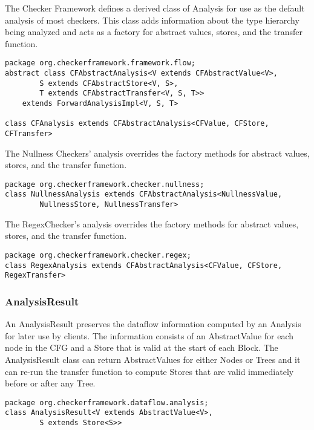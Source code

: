 The Checker Framework defines a derived class of Analysis for use as
the default analysis of most checkers.  This class adds information
about the type hierarchy being analyzed and acts as a factory for
abstract values, stores, and the transfer function.

\begin{verbatim}
package org.checkerframework.framework.flow;
abstract class CFAbstractAnalysis<V extends CFAbstractValue<V>,
        S extends CFAbstractStore<V, S>,
        T extends CFAbstractTransfer<V, S, T>>
    extends ForwardAnalysisImpl<V, S, T>

class CFAnalysis extends CFAbstractAnalysis<CFValue, CFStore, CFTransfer>
\end{verbatim}

The Nullness Checkers' analysis overrides the factory methods for
abstract values, stores, and the transfer function.

\begin{verbatim}
package org.checkerframework.checker.nullness;
class NullnessAnalysis extends CFAbstractAnalysis<NullnessValue,
        NullnessStore, NullnessTransfer>
\end{verbatim}

The RegexChecker's analysis overrides the factory methods for abstract
values, stores, and the transfer function.

\begin{verbatim}
package org.checkerframework.checker.regex;
class RegexAnalysis extends CFAbstractAnalysis<CFValue, CFStore, RegexTransfer>
\end{verbatim}


\subsubsection{AnalysisResult}
\label{sec:analysis_result_class}

An AnalysisResult preserves the dataflow information computed by an
Analysis for later use by clients.  The information consists of an
AbstractValue for each node in the CFG and a Store that is valid at
the start of each Block.  The AnalysisResult class can return
AbstractValues for either Nodes or Trees and it can re-run the
transfer function to compute Stores that are valid immediately before
or after any Tree.

\begin{verbatim}
package org.checkerframework.dataflow.analysis;
class AnalysisResult<V extends AbstractValue<V>,
        S extends Store<S>>
\end{verbatim}


